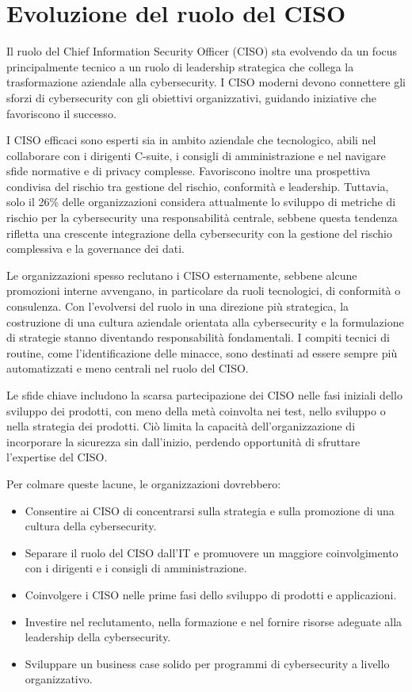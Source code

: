 \documentclass{article}
\begin{document}
\section{Evoluzione del ruolo del CISO}

Il ruolo del Chief Information Security Officer (CISO) sta evolvendo da un focus principalmente tecnico a un ruolo di leadership strategica che collega la trasformazione aziendale alla cybersecurity. I CISO moderni devono connettere gli sforzi di cybersecurity con gli obiettivi organizzativi, guidando iniziative che favoriscono il successo.

I CISO efficaci sono esperti sia in ambito aziendale che tecnologico, abili nel collaborare con i dirigenti C-suite, i consigli di amministrazione e nel navigare sfide normative e di privacy complesse. Favoriscono inoltre una prospettiva condivisa del rischio tra gestione del rischio, conformità e leadership. Tuttavia, solo il 26\% delle organizzazioni considera attualmente lo sviluppo di metriche di rischio per la cybersecurity una responsabilità centrale, sebbene questa tendenza rifletta una crescente integrazione della cybersecurity con la gestione del rischio complessiva e la governance dei dati.

Le organizzazioni spesso reclutano i CISO esternamente, sebbene alcune promozioni interne avvengano, in particolare da ruoli tecnologici, di conformità o consulenza. Con l’evolversi del ruolo in una direzione più strategica, la costruzione di una cultura aziendale orientata alla cybersecurity e la formulazione di strategie stanno diventando responsabilità fondamentali. I compiti tecnici di routine, come l'identificazione delle minacce, sono destinati ad essere sempre più automatizzati e meno centrali nel ruolo del CISO.

Le sfide chiave includono la scarsa partecipazione dei CISO nelle fasi iniziali dello sviluppo dei prodotti, con meno della metà coinvolta nei test, nello sviluppo o nella strategia dei prodotti. Ciò limita la capacità dell'organizzazione di incorporare la sicurezza sin dall'inizio, perdendo opportunità di sfruttare l'expertise del CISO.

Per colmare queste lacune, le organizzazioni dovrebbero:
\begin{itemize}
    \item Consentire ai CISO di concentrarsi sulla strategia e sulla promozione di una cultura della cybersecurity.
    \item Separare il ruolo del CISO dall'IT e promuovere un maggiore coinvolgimento con i dirigenti e i consigli di amministrazione.
    \item Coinvolgere i CISO nelle prime fasi dello sviluppo di prodotti e applicazioni.
    \item Investire nel reclutamento, nella formazione e nel fornire risorse adeguate alla leadership della cybersecurity.
    \item Sviluppare un business case solido per programmi di cybersecurity a livello organizzativo.
\end{itemize}
\end{document}
